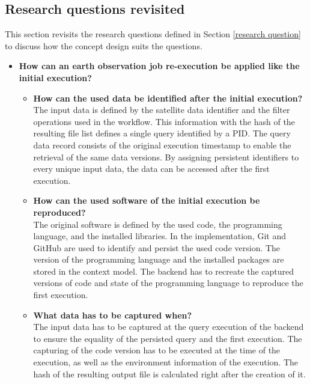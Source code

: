 \documentclass[draft,final]{vutinfth} %
\begin{document}
\subsection{Research questions revisited}\label{research question revisited}
This section revisits the research questions defined in Section \ref{research question} to discuss how the concept design suits the questions.

\begin{itemize}
	\item \textbf{How can an earth observation job re-execution be applied like the initial execution?}
	\begin{itemize}
		\item \textbf{How can the used data be identified after the initial execution?} \\
		The input data is defined by the satellite data identifier and the filter operations used in the workflow. This information with the hash of the resulting file list defines a single query identified by a PID. The query data record consists of the original execution timestamp to enable the retrieval of the same data versions. By assigning persistent identifiers to every unique input data, the data can be accessed after the first execution.   
		\item \textbf{How can the used software of the initial execution be reproduced?} \\
		The original software is defined by the used code, the programming language, and the installed libraries. In the implementation, Git and GitHub are used to identify and persist the used code version. The version of the programming language and the installed packages are stored in the context model. The backend has to recreate the captured versions of code and state of the programming language to reproduce the first execution.       
		\item \textbf{What data has to be captured when?} \\
		The input data has to be captured at the query execution of the backend to ensure the equality of the persisted query and the first execution. The capturing of the code version has to be executed at the time of the execution, as well as the environment information of the execution. The hash of the resulting output file is calculated right after the creation of it.   

\end{itemize}
\end{itemize}
\end{document}
